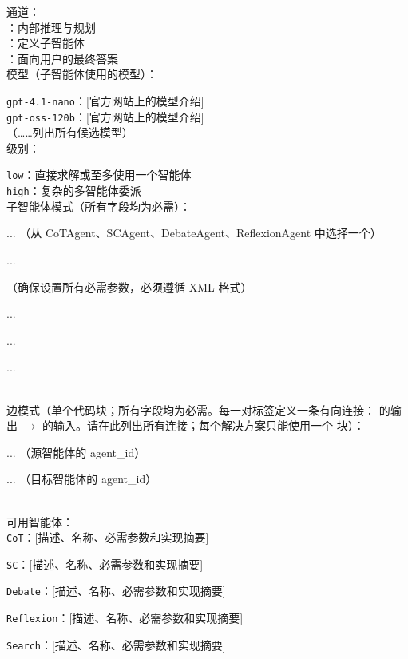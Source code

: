 \begin{developprompt}[title={开发提示词}]
通道：\\
    ：内部推理与规划 \\
    ：定义子智能体 \\
    ：面向用户的最终答案 \\

模型（子智能体使用的模型）：

    \texttt{gpt-4.1-nano}：[官方网站上的模型介绍] \\
    \texttt{gpt-oss-120b}：[官方网站上的模型介绍] \\
    （……列出所有候选模型）\\

\masness 级别：

    \texttt{low}：直接求解或至多使用一个智能体 \\
    \texttt{high}：复杂的多智能体委派\\
    
子智能体模式（所有字段均为必需）：\\


\quad{}
...
（从 CoTAgent、SCAgent、DebateAgent、ReflexionAgent 中选择一个）

\quad{}
...

\quad{}
（确保设置所有必需参数，必须遵循 XML 格式）

\qquad{}...

\qquad{}...

\quad{}

\quad{}
...

 \\


边模式（单个代码块；所有字段均为必需。每一对标签定义一条有向连接： 的输出 $\rightarrow$  的输入。请在此列出所有连接；每个解决方案只能使用一个  块）：\\


\quad{}
...
（源智能体的 agent\_id）

\quad{}
...
（目标智能体的 agent\_id）

\\

可用智能体：\\

\texttt{CoT}：[描述、名称、必需参数和实现摘要]

\texttt{SC}：[描述、名称、必需参数和实现摘要]

\texttt{Debate}：[描述、名称、必需参数和实现摘要]

\texttt{Reflexion}：[描述、名称、必需参数和实现摘要]

\texttt{Search}：[描述、名称、必需参数和实现摘要]


\end{developprompt}



